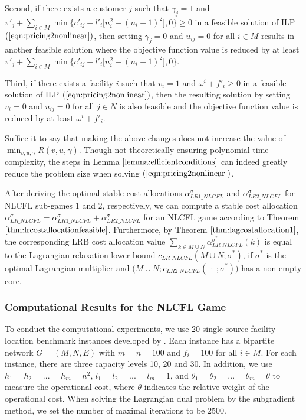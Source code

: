 \documentclass[ijoc,nonblindrev]{informs3} %
\begin{document}
Second, if there exists a customer $j$ such that $\gamma_j = 1$ and $\pi'_j+\sum_{i\in M}\min\{c'_{ij}- l'_i\big[n_i^2 - (n_i-1)^2\big],0\} \geq 0$ in a feasible solution of ILP $(\ref{eqn:pricing2nonlinear})$, then setting $\gamma_j = 0$ and $u_{ij} = 0$ for all $i \in M$ results in another feasible solution where the objective function value is reduced by at least  $\pi'_j+\sum_{i\in M}\min\{c'_{ij}- l'_i\big[n_i^2 - (n_i-1)^2\big],0\}$.

Third, if there exists a facility $i$ such that $v_i = 1$ and $\omega^{i} + f'_{i} \geq 0$ in a feasible solution of ILP $(\ref{eqn:pricing2nonlinear})$, then the resulting solution by setting $v_i = 0$ and $u_{ij} = 0$ for all $j \in N$ is also feasible and the objective function value is reduced by at least $\omega^{i} + f'_{i}$.
\hfill\Halmos


Suffice it to say that making the above changes does not increase the value of $\min_{v;u;\gamma} R(v,u,\gamma)$.
Though not theoretically ensuring polynomial time complexity, the steps  in Lemma $\ref{lemma:efficientconditions}$ can indeed greatly reduce the problem size when solving $(\ref{eqn:pricing2nonlinear})$.

After deriving the optimal stable cost allocations $\alpha_{LR1\_NLCFL}^{\sigma}$ and $\alpha_{LR2\_NLCFL}^{\sigma}$ for NLCFL sub-games 1 and 2, respectively, we can compute a stable cost allocation $\alpha_{LR\_NLCFL}^{\sigma} = \alpha_{LR1\_NLCFL}^{\sigma} + \alpha_{LR2\_NLCFL}^{\sigma}$ for an NLCFL game according to Theorem $\ref{thm:lrcostallocationfeasible}$. Furthermore, by Theorem $\ref{thm:lagcostallocation1}$, the corresponding LRB cost allocation value $\sum_{k \in M\cup N}\alpha^{\sigma^*}_{LR\_NLCFL}(k)$ is equal to the Lagrangian relaxation lower bound $c_{LR\_NLCFL}(M \cup N;\sigma^*)$, if $\sigma^*$ is the optimal Lagrangian multiplier and $\big(M \cup N;c_{LR2\_NLCFL}(\ \cdot\ ;\sigma^*)\big)$ has a non-empty core.




\subsubsection{Computational Results for the NLCFL Game}\label{sec:nlcflcomputation}
To conduct the computational experiments, we use 20 single source facility location benchmark instances developed by \cite{Benchmark}. Each instance has a bipartite network $G=(M,N,E)$ with $m=n=100$ and $f_i=100$ for all $i \in M$.
For each instance, there are three capacity levels  10, 20 and 30.
In addition, we use $h_1 = h_2 = ... = h_m = n^2$, $l_1 = l_2= ... = l_m = 1$, and $\theta_1 = \theta_2 = ... = \theta_m=\theta$ to measure the operational cost, where $\theta$ indicates the relative weight of the operational cost.
When solving the Lagrangian dual problem by the subgradient method, we set the number of maximal iterations to be $2500$.
\end{document}
